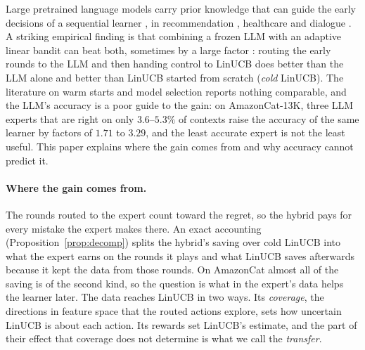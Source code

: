 \documentclass[anon]{alt2027} %
\begin{document}
Large pretrained language models carry prior knowledge that can guide the
early decisions of a sequential learner
\citep{brown2020language,ouyang2022training,achiam2023gpt,alamdari2024jumpstarting,abbasiyadkori2024believe},
in recommendation \citep{li2010contextual,agarwal2016making}, healthcare
\citep{tewari2017ads,svensson2023sequential} and dialogue \citep{li2016deep}.
A striking empirical finding is that combining a frozen LLM with an adaptive
linear bandit can beat both, sometimes by a large factor
\citep{chen2024llmdecision,huangcontextual}: routing the early rounds to the
LLM and then handing control to LinUCB does better than the LLM alone and
better than LinUCB started from scratch (\emph{cold} LinUCB). The literature
on warm starts and model selection
\citep{bastani2021mostly,zhang2019warm,agarwal2017corralling} reports nothing
comparable, and the LLM's accuracy is a poor guide to the gain: on
AmazonCat-13K, three LLM experts that are right on only $3.6$--$5.3\%$ of
contexts raise the accuracy of the same learner by factors of $1.71$ to
$3.29$, and the least accurate expert is not the least useful. This paper
explains where the gain comes from and why accuracy cannot predict it.

\paragraph{Where the gain comes from.}
The rounds routed to the expert count toward the regret, so the hybrid pays
for every mistake the expert makes there. An exact accounting
(Proposition~\ref{prop:decomp}) splits the hybrid's saving over cold LinUCB
into what the expert earns on the rounds it plays and what LinUCB saves
afterwards because it kept the data from those rounds. On AmazonCat almost
all of the saving is of the second kind, so the question is what in the
expert's data helps the learner later. The data reaches LinUCB in two ways.
Its \emph{coverage}, the directions in feature space that the routed actions
explore, sets how uncertain LinUCB is about each action. Its rewards set
LinUCB's estimate, and the part of their effect that coverage does not
determine is what we call the \emph{transfer}.
\end{document}
